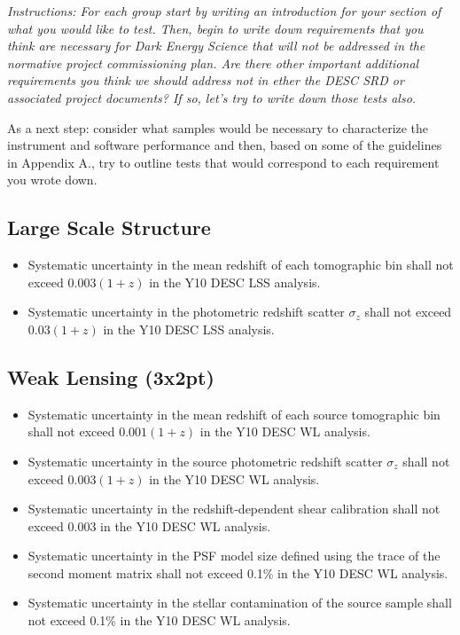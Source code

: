 \documentclass[modern]{desc-tex/styles/lsstdescnote}
\begin{document}
{\it Instructions: For each group start by writing an introduction for your section of what you would like to test.  Then, begin to write down requirements that you think are necessary for Dark Energy Science that will not be addressed in the normative project commissioning plan.  Are there other important additional requirements you think we should address not in ether the DESC SRD or associated project documents?  If so, let's try to write down those tests also.

As a next step: consider what samples would be necessary to characterize the instrument and software performance and then, based on some of the guidelines in Appendix A., try to outline tests that would correspond to each requirement you wrote down. }

\subsection{Large Scale Structure}

\begin{itemize}
\item Systematic uncertainty in the mean redshift of each tomographic bin shall not exceed $0.003 (1 + z)$ in the Y10 DESC LSS analysis.
\item Systematic uncertainty in the photometric redshift scatter $\sigma_z$ shall not exceed $0.03 (1 + z)$ in the Y10 DESC LSS analysis.
\end{itemize}

\subsection{Weak Lensing (3x2pt)}

\begin{itemize}
\item Systematic uncertainty in the mean redshift of each source tomographic bin shall not exceed $0.001 (1 + z)$ in the Y10 DESC WL analysis.
\item Systematic uncertainty in the source photometric redshift scatter $\sigma_z$  shall not exceed $0.003 (1 + z) $ in the Y10 DESC WL analysis.
\item Systematic uncertainty in the redshift-dependent shear calibration shall not exceed 0.003 in the Y10 DESC WL analysis.
\item Systematic uncertainty in the PSF model size defined using the trace of the second moment matrix shall not exceed 0.1\% in the Y10 DESC WL analysis.
\item Systematic uncertainty in the stellar contamination of the source sample shall not exceed 0.1\% in the Y10 DESC WL analysis.
\end{itemize}
\end{document}
